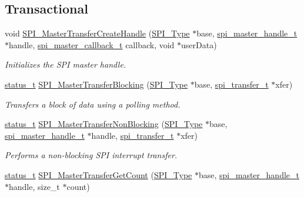 \subsection*{Transactional}
\begin{DoxyCompactItemize}
\item 
void \mbox{\hyperlink{group__spi__driver_ga6cf3e807307ecb22578cc9088adafcf2}{S\+P\+I\+\_\+\+Master\+Transfer\+Create\+Handle}} (\mbox{\hyperlink{struct_s_p_i___type}{S\+P\+I\+\_\+\+Type}} $\ast$base, \mbox{\hyperlink{struct__spi__master__handle}{spi\+\_\+master\+\_\+handle\+\_\+t}} $\ast$handle, \mbox{\hyperlink{group__spi__driver_ga75d9df6e4614756d8ff1bd6f86ca2235}{spi\+\_\+master\+\_\+callback\+\_\+t}} callback, void $\ast$user\+Data)
\begin{DoxyCompactList}\small\item\em Initializes the S\+PI master handle. \end{DoxyCompactList}\item 
\mbox{\hyperlink{group__ksdk__common_gaaabdaf7ee58ca7269bd4bf24efcde092}{status\+\_\+t}} \mbox{\hyperlink{group__spi__driver_ga5b05095245ecf01258e64cc0458fb2e9}{S\+P\+I\+\_\+\+Master\+Transfer\+Blocking}} (\mbox{\hyperlink{struct_s_p_i___type}{S\+P\+I\+\_\+\+Type}} $\ast$base, \mbox{\hyperlink{group__spi__driver_ga59314d5596f240cfbe8b9466bd99ed3f}{spi\+\_\+transfer\+\_\+t}} $\ast$xfer)
\begin{DoxyCompactList}\small\item\em Transfers a block of data using a polling method. \end{DoxyCompactList}\item 
\mbox{\hyperlink{group__ksdk__common_gaaabdaf7ee58ca7269bd4bf24efcde092}{status\+\_\+t}} \mbox{\hyperlink{group__spi__driver_ga820c78a32fa29735168d2e517f4881a1}{S\+P\+I\+\_\+\+Master\+Transfer\+Non\+Blocking}} (\mbox{\hyperlink{struct_s_p_i___type}{S\+P\+I\+\_\+\+Type}} $\ast$base, \mbox{\hyperlink{struct__spi__master__handle}{spi\+\_\+master\+\_\+handle\+\_\+t}} $\ast$handle, \mbox{\hyperlink{group__spi__driver_ga59314d5596f240cfbe8b9466bd99ed3f}{spi\+\_\+transfer\+\_\+t}} $\ast$xfer)
\begin{DoxyCompactList}\small\item\em Performs a non-\/blocking S\+PI interrupt transfer. \end{DoxyCompactList}\item 
\mbox{\hyperlink{group__ksdk__common_gaaabdaf7ee58ca7269bd4bf24efcde092}{status\+\_\+t}} \mbox{\hyperlink{group__spi__driver_gabde0dccfb0783d103b9cf57e0202582f}{S\+P\+I\+\_\+\+Master\+Transfer\+Get\+Count}} (\mbox{\hyperlink{struct_s_p_i___type}{S\+P\+I\+\_\+\+Type}} $\ast$base, \mbox{\hyperlink{struct__spi__master__handle}{spi\+\_\+master\+\_\+handle\+\_\+t}} $\ast$handle, size\+\_\+t $\ast$count)

\end{DoxyCompactItemize}

